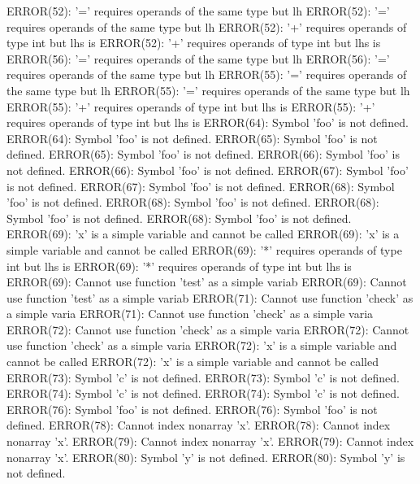 \documentclass[12pt]{book}
\begin{document}
ERROR(52): '=' requires operands of the same type but lh        ERROR(52): '=' requires operands of the same type but lh
ERROR(52): '+' requires operands of type int but lhs is         ERROR(52): '+' requires operands of type int but lhs is 
ERROR(56): '=' requires operands of the same type but lh        ERROR(56): '=' requires operands of the same type but lh
ERROR(55): '=' requires operands of the same type but lh        ERROR(55): '=' requires operands of the same type but lh
ERROR(55): '+' requires operands of type int but lhs is         ERROR(55): '+' requires operands of type int but lhs is 
ERROR(64): Symbol 'foo' is not defined.                                ERROR(64): Symbol 'foo' is not defined.
ERROR(65): Symbol 'foo' is not defined.                                ERROR(65): Symbol 'foo' is not defined.
ERROR(66): Symbol 'foo' is not defined.                                ERROR(66): Symbol 'foo' is not defined.
ERROR(67): Symbol 'foo' is not defined.                                ERROR(67): Symbol 'foo' is not defined.
ERROR(68): Symbol 'foo' is not defined.                                ERROR(68): Symbol 'foo' is not defined.
ERROR(68): Symbol 'foo' is not defined.                                ERROR(68): Symbol 'foo' is not defined.
ERROR(69): 'x' is a simple variable and cannot be called        ERROR(69): 'x' is a simple variable and cannot be called
ERROR(69): '*' requires operands of type int but lhs is         ERROR(69): '*' requires operands of type int but lhs is 
ERROR(69): Cannot use function 'test' as a simple variab        ERROR(69): Cannot use function 'test' as a simple variab
ERROR(71): Cannot use function 'check' as a simple varia        ERROR(71): Cannot use function 'check' as a simple varia
ERROR(72): Cannot use function 'check' as a simple varia        ERROR(72): Cannot use function 'check' as a simple varia
ERROR(72): 'x' is a simple variable and cannot be called        ERROR(72): 'x' is a simple variable and cannot be called
ERROR(73): Symbol 'c' is not defined.                                ERROR(73): Symbol 'c' is not defined.
ERROR(74): Symbol 'c' is not defined.                                ERROR(74): Symbol 'c' is not defined.
ERROR(76): Symbol 'foo' is not defined.                                ERROR(76): Symbol 'foo' is not defined.
ERROR(78): Cannot index nonarray 'x'.                                ERROR(78): Cannot index nonarray 'x'.
ERROR(79): Cannot index nonarray 'x'.                                ERROR(79): Cannot index nonarray 'x'.
ERROR(80): Symbol 'y' is not defined.                                ERROR(80): Symbol 'y' is not defined.
\end{document}
